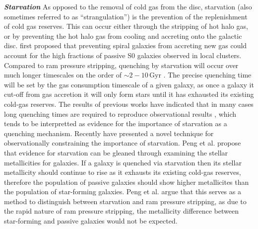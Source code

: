 \noindent \textit{\textbf{Starvation}}
\smallskip
\newline
As opposed to the removal of cold gas from the disc, starvation (also
sometimes referred to as ``strangulation'') is the prevention of the
replenishment of cold gas reserves.  This can occur either through the
stripping of hot halo gas, or by preventing the hot halo gas from
cooling and accreting onto the galactic disc.  \citet{larson1980}
first proposed that preventing spiral galaxies from accreting new gas
could account for the high fractions of passive S0 galaxies observed
in local clusters.  Compared to ram pressure stripping, quenching by
starvation will occur over much longer timescales on the order of
$\sim 2 - 
10\,\mathrm{Gyr}$ \citep{wheeler2014, fillingham2015, peng2015,
  wetzel2015}.  The precise quenching time
will be set by the gas consumption timescale of a given galaxy, as
once a galaxy it cut-off from gas accretion it will only form stars
until it has exhausted its existing cold-gas reserves.  The results of
previous works have indicated that in many cases long quenching times
are required to reproduce observational results \citep{balogh2000,
  balogh2000b, wetzel2013, wheeler2014}, which tends to be interpretted as
evidence for the importance of starvation as a quenching mechanism.
Recently \citet{peng2015} have presented a novel technique for
observationally constraining the importance of starvation.  Peng et
al. propose that evidence for starvation can be gleaned through
examining the stellar metallicities for galaxies.  If a galaxy is
quenched via starvation then its stellar metallicity should continue
to rise as it exhausts its existing cold-gas reserves, therefore the
population of passive galaxies should show higher metallicites than
the population of star-forming galaxies.  Peng et al. argue that this
serves as a method to distinguish between starvation and ram pressure
stripping, as due to the rapid nature of ram pressure stripping, the
metallicity difference between star-forming and passive galaxies would
not be expected.\newline  

